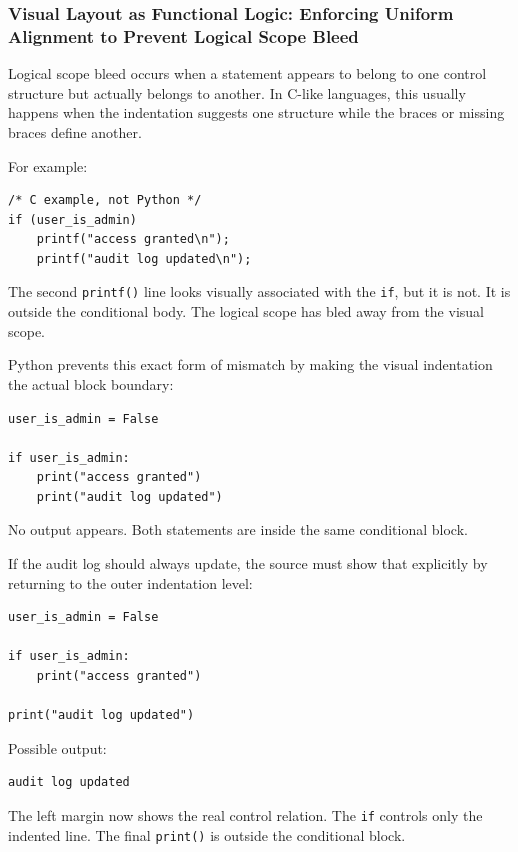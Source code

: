 \documentclass[a4paper,twoside]{report}
\begin{document}
\subsubsection{Visual Layout as Functional Logic: Enforcing Uniform Alignment to Prevent Logical Scope Bleed}

Logical scope bleed occurs when a statement appears to belong to one control structure but actually belongs to another. In C-like languages, this usually happens when the indentation suggests one structure while the braces or missing braces define another.

For example:

\begin{verbatim}
/* C example, not Python */
if (user_is_admin)
    printf("access granted\n");
    printf("audit log updated\n");
\end{verbatim}

The second \texttt{printf()} line looks visually associated with the \texttt{if}, but it is not. It is outside the conditional body. The logical scope has bled away from the visual scope.

Python prevents this exact form of mismatch by making the visual indentation the actual block boundary:

\begin{verbatim}
user_is_admin = False

if user_is_admin:
    print("access granted")
    print("audit log updated")
\end{verbatim}

No output appears. Both statements are inside the same conditional block.

If the audit log should always update, the source must show that explicitly by returning to the outer indentation level:

\begin{verbatim}
user_is_admin = False

if user_is_admin:
    print("access granted")

print("audit log updated")
\end{verbatim}

Possible output:

\begin{verbatim}
audit log updated
\end{verbatim}

The left margin now shows the real control relation. The \texttt{if} controls only the indented line. The final \texttt{print()} is outside the conditional block.
\end{document}
